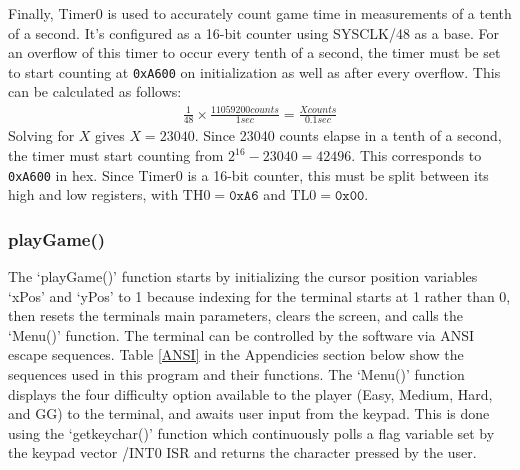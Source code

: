 \documentclass[12pt]{article}
\begin{document}
	Finally, Timer0 is used to accurately count game time in measurements of a tenth of a second. It's configured as a 16-bit counter using SYSCLK/48 as a base. For an overflow of this timer to occur every tenth of a second, the timer must be set to start counting at \texttt{0xA600} on initialization as well as after every overflow. This can be calculated as follows:
	\begin{gather*}
		\frac{1}{48}\times \frac{11059200 \si{counts}}{\si{1}{sec}}=\frac{X\si{counts}}{0.1\si{sec}}
	\end{gather*}
	Solving for $X$ gives $X=23040$. Since 23040 counts elapse in a tenth of a second, the timer must start counting from $2^{16}-23040=42496$. This corresponds to \texttt{0xA600} in hex. Since Timer0 is a 16-bit counter, this must be split between its high and low registers, with $\mathrm{TH0}=\texttt{0xA6}$ and $\mathrm{TL0}=\texttt{0x00}$.
	
	\subsubsection{playGame()}
	The `playGame()' function starts by initializing the cursor position variables `xPos' and `yPos' to 1 because indexing for the terminal starts at 1 rather than 0, then resets the terminals main parameters, clears the screen, and calls the `Menu()' function. The terminal can be controlled by the software via ANSI escape sequences. Table \ref{ANSI} in the Appendicies section below show the sequences used in this program and their functions. The `Menu()' function displays the four difficulty option available to the player (Easy, Medium, Hard, and GG) to the terminal, and awaits user input from the keypad. This is done using the `getkeychar()' function which continuously polls a flag variable set by the keypad vector /INT0 ISR and returns the character pressed by the user.
	
\end{document}
